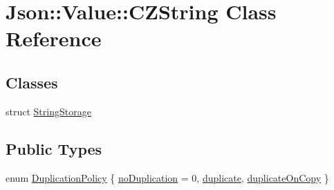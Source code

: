 \hypertarget{classJson_1_1Value_1_1CZString}{}\section{Json\+:\+:Value\+:\+:C\+Z\+String Class Reference}
\label{classJson_1_1Value_1_1CZString}
\subsection*{Classes}
\begin{DoxyCompactItemize}
\item 
struct \hyperlink{structJson_1_1Value_1_1CZString_1_1StringStorage}{String\+Storage}
\end{DoxyCompactItemize}
\subsection*{Public Types}
\begin{DoxyCompactItemize}
\item 
enum \hyperlink{classJson_1_1Value_1_1CZString_a2805c46fb4a72bbaed55de6d75941b6d_a2805c46fb4a72bbaed55de6d75941b6d}{Duplication\+Policy} \{ \hyperlink{classJson_1_1Value_1_1CZString_a2805c46fb4a72bbaed55de6d75941b6d_a2805c46fb4a72bbaed55de6d75941b6da08d540450fa6c4af57eaacf063eedd20}{no\+Duplication} = 0, 
\hyperlink{classJson_1_1Value_1_1CZString_a2805c46fb4a72bbaed55de6d75941b6d_a2805c46fb4a72bbaed55de6d75941b6dabb2134294dd8fc37dd82d18bb794fe20}{duplicate}, 
\hyperlink{classJson_1_1Value_1_1CZString_a2805c46fb4a72bbaed55de6d75941b6d_a2805c46fb4a72bbaed55de6d75941b6da5c18c35205a3be63ad14ce659e70fe7d}{duplicate\+On\+Copy}
 \}
\end{DoxyCompactItemize}
